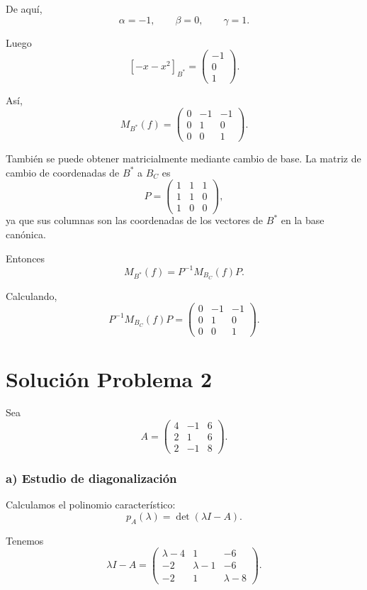 \documentclass[12pt]{article}
\begin{document}
De aquí,
\[
\alpha=-1,
\qquad
\beta=0,
\qquad
\gamma=1.
\]

Luego
\[
[-x-x^2]_{B^*}=
\begin{pmatrix}
-1\\0\\1
\end{pmatrix}.
\]

Así,
\[
\boxed{
M_{B^*}(f)=
\begin{pmatrix}
0&-1&-1\\
0&1&0\\
0&0&1
\end{pmatrix}.
}
\]

También se puede obtener matricialmente mediante cambio de base.
La matriz de cambio de coordenadas de \(B^*\) a \(B_C\) es
\[
P=
\begin{pmatrix}
1&1&1\\
1&1&0\\
1&0&0
\end{pmatrix},
\]
ya que sus columnas son las coordenadas de los vectores de \(B^*\) en la base canónica.

Entonces
\[
M_{B^*}(f)=P^{-1}M_{B_C}(f)P.
\]

Calculando,
\[
P^{-1}M_{B_C}(f)P=
\begin{pmatrix}
0&-1&-1\\
0&1&0\\
0&0&1
\end{pmatrix}.
\]

\section*{Solución Problema 2}

Sea
\[
A=
\begin{pmatrix}
4&-1&6\\
2&1&6\\
2&-1&8
\end{pmatrix}.
\]

\subsubsection*{a) Estudio de diagonalización}

Calculamos el polinomio característico:
\[
p_A(\lambda)=\det(\lambda I-A).
\]

Tenemos
\[
\lambda I-A=
\begin{pmatrix}
\lambda-4&1&-6\\
-2&\lambda-1&-6\\
-2&1&\lambda-8
\end{pmatrix}.
\]
\end{document}
